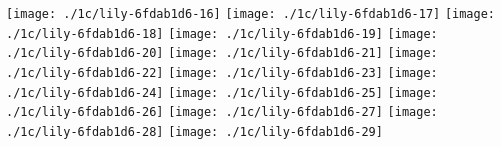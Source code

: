   \linebreak
\else
  \expandafter{}%
\fi
\texttt{[image: ./1c/lily-6fdab1d6-16]}%
\ifx\betweenLilyPondSystem \undefined
  \linebreak
\else
  \expandafter{}%
\fi
\texttt{[image: ./1c/lily-6fdab1d6-17]}%
\ifx\betweenLilyPondSystem \undefined
  \linebreak
\else
  \expandafter{}%
\fi
\texttt{[image: ./1c/lily-6fdab1d6-18]}%
\ifx\betweenLilyPondSystem \undefined
  \linebreak
\else
  \expandafter{}%
\fi
\texttt{[image: ./1c/lily-6fdab1d6-19]}%
\ifx\betweenLilyPondSystem \undefined
  \linebreak
\else
  \expandafter{}%
\fi
\texttt{[image: ./1c/lily-6fdab1d6-20]}%
\ifx\betweenLilyPondSystem \undefined
  \linebreak
\else
  \expandafter{}%
\fi
\texttt{[image: ./1c/lily-6fdab1d6-21]}%
\ifx\betweenLilyPondSystem \undefined
  \linebreak
\else
  \expandafter{}%
\fi
\texttt{[image: ./1c/lily-6fdab1d6-22]}%
\ifx\betweenLilyPondSystem \undefined
  \linebreak
\else
  \expandafter{}%
\fi
\texttt{[image: ./1c/lily-6fdab1d6-23]}%
\ifx\betweenLilyPondSystem \undefined
  \linebreak
\else
  \expandafter{}%
\fi
\texttt{[image: ./1c/lily-6fdab1d6-24]}%
\ifx\betweenLilyPondSystem \undefined
  \linebreak
\else
  \expandafter{}%
\fi
\texttt{[image: ./1c/lily-6fdab1d6-25]}%
\ifx\betweenLilyPondSystem \undefined
  \linebreak
\else
  \expandafter{}%
\fi
\texttt{[image: ./1c/lily-6fdab1d6-26]}%
\ifx\betweenLilyPondSystem \undefined
  \linebreak
\else
  \expandafter{}%
\fi
\texttt{[image: ./1c/lily-6fdab1d6-27]}%
\ifx\betweenLilyPondSystem \undefined
  \linebreak
\else
  \expandafter{}%
\fi
\texttt{[image: ./1c/lily-6fdab1d6-28]}%
\ifx\betweenLilyPondSystem \undefined
  \linebreak
\else
  \expandafter{}%
\fi
\texttt{[image: ./1c/lily-6fdab1d6-29]}%
\ifx\betweenLilyPondSystem \undefined
  \linebreak
